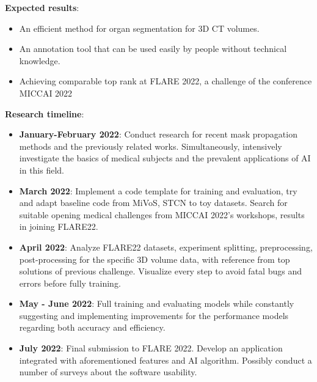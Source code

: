 \documentclass[12pt]{article}
\begin{document}
\textbf{Expected results}: 
\begin{itemize}
    \item An efficient method for organ segmentation for 3D CT volumes.
    \item An annotation tool that can be used easily by people without technical knowledge. 
    \item Achieving comparable top rank at FLARE 2022, a challenge of the conference MICCAI 2022
\end{itemize}
\vspace{8mm}
\textbf{Research timeline}:
\begin{itemize}
    \item \textbf{January-February 2022}: Conduct research for recent mask propagation methods and the previously related works. Simultaneously, intensively investigate the basics of medical subjects and the prevalent applications of AI in this field.
    \item \textbf{March 2022}: Implement a code template for training and evaluation, try and adapt baseline code from MiVoS, STCN to toy datasets. Search for suitable opening medical challenges from MICCAI 2022’s workshops, results in joining FLARE22.
    \item \textbf{April 2022}: Analyze FLARE22 datasets, experiment splitting, preprocessing, post-processing for the specific 3D volume data, with reference from top solutions of previous challenge. Visualize every step to avoid fatal bugs and errors before fully training.
    \item \textbf{May - June 2022}: Full training and evaluating models while constantly suggesting and implementing improvements for the performance models regarding both accuracy and efficiency.
    \item \textbf{July 2022}: Final submission to FLARE 2022. Develop an application integrated with aforementioned features and AI algorithm. Possibly conduct a number of surveys about the software usability.
\end{itemize}

\vspace{15pt}
\end{document}
